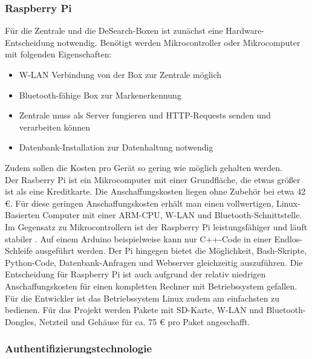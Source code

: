 \subsubsection{Raspberry Pi}
Für die Zentrale und die DeSearch-Boxen ist zunächst eine Hardware-Entscheidung notwendig. Benötigt werden Mikrocontroller oder Mikrocomputer mit folgenden Eigenschaften:
\begin{itemize}
	\item W-LAN Verbindung von der Box zur Zentrale möglich
	\item Bluetooth-fähige Box zur Markenerkennung
	\item Zentrale muss als Server fungieren und HTTP-Requests senden und verarbeiten können
	\item Datenbank-Installation zur Datenhaltung notwendig
\end{itemize}
Zudem sollen die Kosten pro Gerät so gering wie möglich gehalten werden. \\
Der Rasberry Pi ist ein Mikrocomputer mit einer Grundfläche, die etwas größer ist als eine Kreditkarte. Die Anschaffungskosten liegen ohne Zubehör bei etwa 42 €. Für diese geringen Anschaffungskosten erhält man einen vollwertigen, Linux-Basierten Computer mit einer ARM-CPU, W-LAN und Bluetooth-Schnittstelle. Im Gegensatz zu Mikrocontrollern ist der Raspberry Pi leistungsfähiger und läuft stabiler \citep[Vgl.][S.35ff.]{raspi}. Auf einem Arduino beispielweise kann nur C++-Code in einer Endlos-Schleife ausgeführt werden. Der Pi hingegen bietet die Möglichkeit, Bash-Skripte, Python-Code, Datenbank-Anfragen und Webserver gleichzeitig auszuführen. Die Entscheidung für Raspberry Pi ist auch aufgrund der relativ niedrigen Anschaffungskosten für einen kompletten Rechner mit Betriebssystem gefallen. Für die Entwickler ist das Betriebssystem Linux zudem am einfachsten zu bedienen. Für das Projekt werden Pakete mit SD-Karte, W-LAN und Bluetooth-Dongles, Netzteil und Gehäuse für ca. 75 € pro Paket angeschafft.
\subsubsection{Authentifizierungstechnologie}
